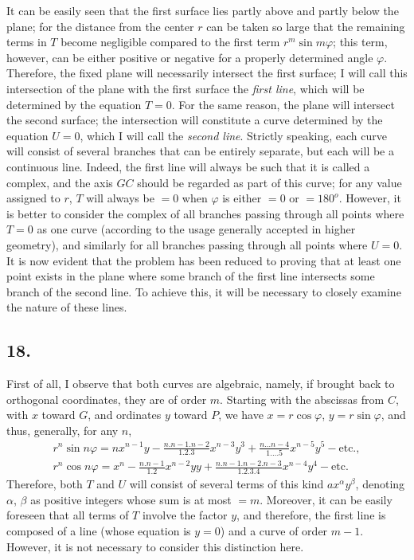 \documentclass[12pt]{memoir}
\theoremstyle{plain}
\theoremstyle{remark}
\begin{document}
It can be easily seen that the first surface lies partly above and partly below the plane; for the distance from the center \(r\) can be taken so large that the remaining terms in \(T\) become negligible compared to the first term \(r^m \sin m \varphi\); this term, however, can be either positive or negative for a properly determined angle \(\varphi\). Therefore, the fixed plane will necessarily intersect the first surface; I will call this intersection of the plane with the first surface the \textit{first line}, which will be determined by the equation \(T = 0\). For the same reason, the plane will intersect the second surface; the intersection will constitute a curve determined by the equation \(U = 0\), which I will call the \textit{second line}. Strictly speaking, each curve will consist of several branches that can be entirely separate, but each will be a continuous line. Indeed, the first line will always be such that it is called a complex, and the axis \(GC\) should be regarded as part of this curve; for any value assigned to \(r\), \(T\) will always be \(= 0\) when \(\varphi\) is either \(= 0\) or \(= 180^o\). However, it is better to consider the complex of all branches passing through all points where \(T = 0\) as one curve (according to the usage generally accepted in higher geometry), and similarly for all branches passing through all points where \(U=0\). It is now evident that the problem has been reduced to proving that at least one point exists in the plane where some branch of the first line intersects some branch of the second line. To achieve this, it will be necessary to closely examine the nature of these lines.

\subsection*{18.}

First of all, I observe that both curves are algebraic, namely, if brought back to orthogonal coordinates, they are of order \(m\). Starting with the abscissas from \(C\), with \(x\) toward \(G\), and ordinates \(y\) toward \(P\), we have \(x = r \cos \varphi\), \(y = r \sin \varphi \), and thus, generally, for any \(n\), \begin{align*} r^n \sin n \varphi = nx^{n-1}y - \tfrac{n . n-1 . n-2}{1 . 2 . 3} x^{n-3} y^3 + \tfrac{n \dots n-4}{1 \dots . 5} x^{n-5}y^5 - \text{etc.}, \\ r^n \cos n \varphi = x^n - \tfrac{n . n-1}{1 . 2} x^{n-2} yy + \tfrac{n . n-1 . n-2 . n-3 }{ 1 . 2 . 3 . 4} x^{n-4}y^4 - \text{etc.} \end{align*} Therefore, both \(T\) and \(U\) will consist of several terms of this kind \(a x^{\alpha} y^{\beta} \), denoting \(\alpha\), \(\beta\) as positive integers whose sum is at most \(= m\). Moreover, it can be easily foreseen that all terms of \(T\) involve the factor \(y\), and therefore, the first line is composed of a line (whose equation is \(y = 0\)) and a curve of order \(m-1\). However, it is not necessary to consider this distinction here.
\end{document}
